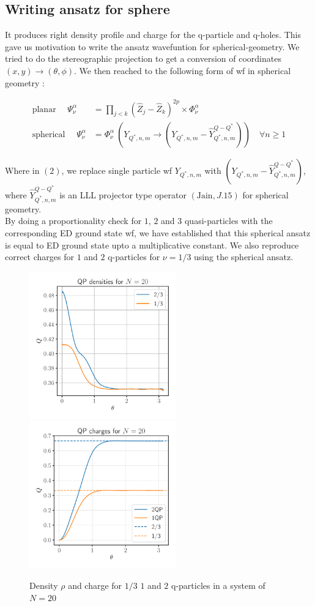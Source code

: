 \documentclass[11pt,a4paper,notitlepage]{article}
\newcommand{\req}[1]{\text{eq}$( #1 )$}
\begin{document}
\subsection{Writing ansatz for sphere}
	It produces right density profile and charge for the q-particle and q-holes. This gave us motivation to write the ansatz wavefuntion for spherical-geometry. We tried to do the stereographic projection to get a conversion of coordinates $(x,y)\rightarrow (\theta,\phi)$. We then reached to the following form of wf in spherical geometry :
	
	\begin{align}
		\text{planar }\quad \Psi^{\alpha}_{\nu} &= \prod_{j<k} (\hat{Z}_j-\hat{Z}_k)^{2p}\times \Phi^{\alpha}_{\nu} \\
		\text{spherical }\quad \Psi^{\alpha}_{\nu} &= \Phi^{\alpha}_{\nu}\ (Y_{Q^{*},n,m}\rightarrow (Y_{Q^{*},n,m}-\hat{Y}^{Q-Q^{*}}_{Q^{*},n,m}))\quad \forall n \geq 1
	\end{align}
	
	Where in \req{2}, we replace single particle wf $Y_{Q^{*},n,m}$ with $(Y_{Q^{*},n,m}-\hat{Y}^{Q-Q^{*}}_{Q^{*},n,m})$, where $\hat{Y}^{Q-Q^{*}}_{Q^{*},n,m}$ is an LLL projector type operator $(\text{Jain}, J.15)$ for spherical geometry.\\
	
	 By doing a proportionality check for $1$, $2$ and $3$ quasi-particles with the corresponding ED ground state wf, we have established that this spherical ansatz is equal to ED ground state upto a multiplicative constant. We also reproduce correct charges for $1$ and $2$ q-particles for $\nu=1/3$ using the spherical ansatz.
	 
	 \begin{figure}[h]
		\centering
		\includegraphics[width=2.5in]{figures/qp_densities_1b3_ansatz.pdf}
		\includegraphics[width=2.5in]{figures/qp_charges_1b3_ansatz.pdf}
		\caption{Density $\rho$ and charge for $1/3$ $1$ and $2$ q-particles in a system of $N=20$}
	\end{figure}
	
\end{document}
